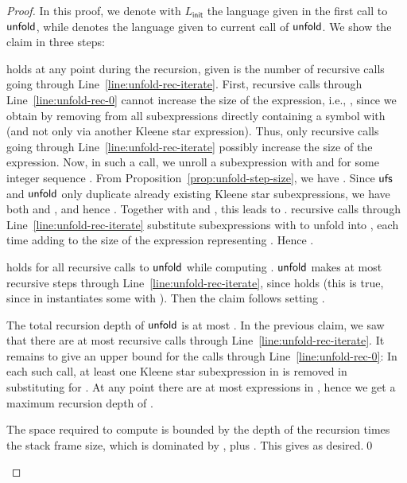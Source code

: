 \documentclass[envcountsame]{llncs}
\newcommand{\unfold}{\ensuremath{{\sf unfold}}\xspace}
\newcommand{\unfoldstep}{\ensuremath{{\sf ufs}}\xspace}
\newcommand{\Linit}{\ensuremath{L_\mathsf{init}}\xspace}
\begin{document}
\begin{proof}
  In this proof, we denote with \Linit the language given in the first
  call to \unfold, while  denotes the language given to current
  call of \unfold. 
  We show the claim in three steps: 
  \begin{inparaenum}[\bfseries(1)]
  \item  holds at any point during the
    recursion, given  is the number of recursive calls going through
    Line~\ref{line:unfold-rec-iterate}.
First, recursive calls through Line~\ref{line:unfold-rec-0} cannot
    increase the size of the expression, i.e., ,
    since we obtain  by removing from  all
    subexpressions directly containing a symbol  with
     (and not only via another Kleene
    star expression).
Thus, only recursive calls going through
    Line~\ref{line:unfold-rec-iterate} possibly increase the size of
    the expression.
Now, in such a call, we unroll a subexpression  with
     and  for some integer sequence .
From Proposition~\ref{prop:unfold-step-size}, we have
    . 
Since \unfoldstep and \unfold only duplicate already existing
    Kleene star subexpressions, we have both 
    and , and hence
    .
Together with  and , this
    leads to .
 recursive calls through Line~\ref{line:unfold-rec-iterate}
    substitute  subexpressions  with  to unfold  into , each time adding
     to the size of the expression representing
    .
Hence . 



  \item  holds for all recursive calls to
    \unfold while computing .
\unfold makes at most  recursive steps through
    Line~\ref{line:unfold-rec-iterate}, since
     holds (this is
    true, since  in  instantiates some  with
    ).
Then the claim follows setting .


  \item The total recursion depth of \unfold is at most
    .
In the previous claim, we saw that there are at most  recursive
    calls through Line~\ref{line:unfold-rec-iterate}.
It remains to give an upper bound for the calls through
    Line~\ref{line:unfold-rec-0}:
In each such call, at least one Kleene star subexpression in 
    is removed in substituting  for .
At any point there are at most 
    expressions in , hence we get a maximum recursion depth of
    . 


  \item The space required to compute  is
    bounded by the depth of the recursion times the stack frame size,
    which is dominated by , plus .
This gives  as desired.\qed
  \end{inparaenum}
\end{proof}
\end{document}
